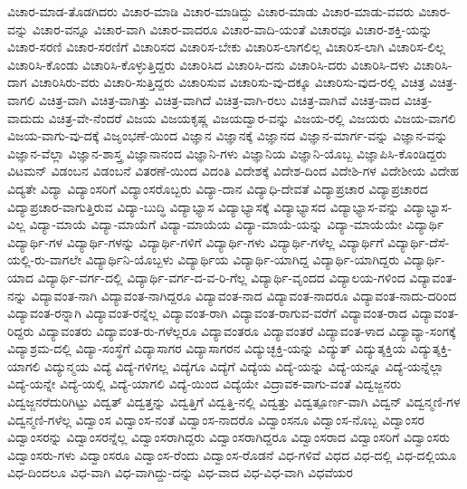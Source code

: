 {ವಿಚಾರ-ಮಾಡ-ತೊಡಗಿದರು
ವಿಚಾರ-ಮಾಡಿ
ವಿಚಾರ-ಮಾಡಿದ್ದು
ವಿಚಾರ-ಮಾಡು
ವಿಚಾರ-ಮಾಡು-ವವರು
ವಿಚಾರ-ವನ್ನು
ವಿಚಾರ-ವನ್ನೂ
ವಿಚಾರ-ವಾಗಿ
ವಿಚಾರ-ವಾದರೂ
ವಿಚಾರ-ವಾದಿ-ಯಂತೆ
ವಿಚಾರವೂ
ವಿಚಾರ-ಶಕ್ತಿ-ಯನ್ನು
ವಿಚಾರ-ಸರಣಿ
ವಿಚಾರ-ಸರಣಿಗೆ
ವಿಚಾರಿಸದ
ವಿಚಾರಿಸ-ಬೇಕು
ವಿಚಾರಿಸ-ಲಾಗಲಿಲ್ಲ
ವಿಚಾರಿಸ-ಲಾಗಿ
ವಿಚಾರಿಸ-ಲಿಲ್ಲ
ವಿಚಾರಿಸಿ-ಕೊಂಡು
ವಿಚಾರಿಸಿ-ಕೊಳ್ಳುತ್ತಿದ್ದರು
ವಿಚಾರಿಸಿದ
ವಿಚಾರಿಸಿ-ದನು
ವಿಚಾರಿಸಿ-ದರು
ವಿಚಾರಿಸಿ-ದಳು
ವಿಚಾರಿಸಿ-ದಾಗ
ವಿಚಾರಿಸಿರು-ವರು
ವಿಚಾರಿ-ಸುತ್ತಿದ್ದರು
ವಿಚಾರಿಸುವ
ವಿಚಾರಿಸು-ವು-ದಕ್ಕೂ
ವಿಚಾರಿಸು-ವುದ-ರಲ್ಲಿ
ವಿಚಿತ್ರ
ವಿಚಿತ್ರ-ವಾಗಲಿ
ವಿಚಿತ್ರ-ವಾಗಿ
ವಿಚಿತ್ರ-ವಾಗಿತ್ತು
ವಿಚಿತ್ರ-ವಾಗಿದೆ
ವಿಚಿತ್ರ-ವಾಗಿ-ರಲು
ವಿಚಿತ್ರ-ವಾಗಿವೆ
ವಿಚಿತ್ರ-ವಾದ
ವಿಚಿತ್ರ-ವಾದುದು
ವಿಚಿತ್ರ-ವೇ-ನೆಂದರೆ
ವಿಜಯ
ವಿಜಯಕೃಷ್ಣ
ವಿಜಯದ್ವಾರ-ವನ್ನು
ವಿಜಯ-ರಲ್ಲಿ
ವಿಜಯರು
ವಿಜಯ-ವಾಗಲಿ
ವಿಜಯ-ವಾಗು-ವು-ದಕ್ಕೆ
ವಿಜೃಂಭಣೆ-ಯಿಂದ
ವಿಜ್ಞಾನ
ವಿಜ್ಞಾನಕ್ಕೆ
ವಿಜ್ಞಾನದ
ವಿಜ್ಞಾನ-ಮಾರ್ಗ-ವನ್ನು
ವಿಜ್ಞಾನ-ವನ್ನು
ವಿಜ್ಞಾನ-ವೆಲ್ಲಾ
ವಿಜ್ಞಾನ-ಶಾಸ್ತ್ರ
ವಿಜ್ಞಾನಾನಂದ
ವಿಜ್ಞಾನಿ-ಗಳು
ವಿಜ್ಞಾನಿಯ
ವಿಜ್ಞಾನಿ-ಯೊಬ್ಬ
ವಿಜ್ಞಾಪಿಸಿ-ಕೊಂಡಿದ್ದರು
ವಿಟಮನ್
ವಿಡಂಬನ
ವಿಡಂಬನೆ
ವಿತರಣೆ-ಯಿಂದ
ವಿದಂತಿ
ವಿದೇಶಕ್ಕೆ
ವಿದೇಶ-ದಿಂದ
ವಿದೇಶಿ-ಗಳ
ವಿದೇಶೀಯ
ವಿದೇಹ
ವಿದ್ಯತೇ
ವಿದ್ಯಾ
ವಿದ್ಯಾಂಸರಿಗೆ
ವಿದ್ಯಾಂಸರೊಬ್ಬರು
ವಿದ್ಯಾ-ದಾನ
ವಿದ್ಯಾಧಿ-ದೇವತೆ
ವಿದ್ಯಾಪ್ರಚಾರ
ವಿದ್ಯಾಪ್ರಚಾರದ
ವಿದ್ಯಾಪ್ರಚಾರ-ವಾಗುತ್ತಿರುವ
ವಿದ್ಯಾ-ಬುದ್ಧಿ
ವಿದ್ಯಾಭ್ಯಾಸ
ವಿದ್ಯಾಭ್ಯಾಸಕ್ಕೆ
ವಿದ್ಯಾಭ್ಯಾಸದ
ವಿದ್ಯಾಭ್ಯಾಸ-ವನ್ನು
ವಿದ್ಯಾಭ್ಯಾಸ-ವಿಲ್ಲ
ವಿದ್ಯಾ-ಮಾಯೆ
ವಿದ್ಯಾ-ಮಾಯೆಗೆ
ವಿದ್ಯಾ-ಮಾಯೆಯ
ವಿದ್ಯಾ-ಮಾಯೆ-ಯನ್ನು
ವಿದ್ಯಾ-ಮಾಯೆಯೇ
ವಿದ್ಯಾರ್ಥಿ
ವಿದ್ಯಾರ್ಥಿ-ಗಳ
ವಿದ್ಯಾರ್ಥಿ-ಗಳನ್ನು
ವಿದ್ಯಾರ್ಥಿ-ಗಳಿಗೆ
ವಿದ್ಯಾರ್ಥಿ-ಗಳು
ವಿದ್ಯಾರ್ಥಿ-ಗಳೆಲ್ಲ
ವಿದ್ಯಾರ್ಥಿಗೆ
ವಿದ್ಯಾರ್ಥಿ-ದೆಸೆ-ಯಲ್ಲಿ-ರು-ವಾಗಲೇ
ವಿದ್ಯಾರ್ಥಿನಿ-ಯೊಬ್ಬಳು
ವಿದ್ಯಾರ್ಥಿಯ
ವಿದ್ಯಾರ್ಥಿ-ಯಾಗಿದ್ದ
ವಿದ್ಯಾರ್ಥಿ-ಯಾಗಿದ್ದರು
ವಿದ್ಯಾರ್ಥಿ-ಯಾದ
ವಿದ್ಯಾರ್ಥಿ-ವರ್ಗ-ದಲ್ಲಿ
ವಿದ್ಯಾರ್ಥಿ-ವರ್ಗ-ದ-ವ-ರಿ-ಗೆಲ್ಲ
ವಿದ್ಯಾರ್ಥಿ-ವೃಂದದ
ವಿದ್ಯಾಲಯ-ಗಳಿಂದ
ವಿದ್ಯಾವಂತ-ನನ್ನು
ವಿದ್ಯಾವಂತ-ನಾಗಿ
ವಿದ್ಯಾವಂತ-ನಾಗಿದ್ದರೂ
ವಿದ್ಯಾವಂತ-ನಾದ
ವಿದ್ಯಾವಂತ-ನಾದರೂ
ವಿದ್ಯಾವಂತ-ನಾದು-ದರಿಂದ
ವಿದ್ಯಾವಂತ-ರನ್ನಾಗಿ
ವಿದ್ಯಾವಂತ-ರನ್ನೆಲ್ಲ
ವಿದ್ಯಾವಂತ-ರಾಗಿ
ವಿದ್ಯಾವಂತ-ರಾಗುವ-ವರೆಗೆ
ವಿದ್ಯಾವಂತ-ರಾದ
ವಿದ್ಯಾವಂತ-ರಿದ್ದರು
ವಿದ್ಯಾವಂತರು
ವಿದ್ಯಾವಂತ-ರು-ಗಳೆಲ್ಲರೂ
ವಿದ್ಯಾವಂತರೂ
ವಿದ್ಯಾವಂತರೆ
ವಿದ್ಯಾವಂತ-ಳಾದ
ವಿದ್ಯಾವ್ಯಾ-ಸಂಗಕ್ಕೆ
ವಿದ್ಯಾಶ್ರಮ-ದಲ್ಲಿ
ವಿದ್ಯಾ-ಸಂಸ್ಥೆಗೆ
ವಿದ್ಯಾಸಾಗರ
ವಿದ್ಯಾಸಾಗರನ
ವಿದ್ಯುಚ್ಛಕ್ತಿ-ಯನ್ನು
ವಿದ್ಯುತ್
ವಿದ್ಯುತ್ಶಕ್ತಿಯ
ವಿದ್ಯುತ್ಶಕ್ತಿ-ಯಾಗಲಿ
ವಿದ್ಯುನ್ಮಯ
ವಿದ್ಯೆ
ವಿದ್ಯೆ-ಗಳಿಗಲ್ಲ
ವಿದ್ಯೆಗೂ
ವಿದ್ಯೆಗೆ
ವಿದ್ಯೆಯ
ವಿದ್ಯೆ-ಯನ್ನು
ವಿದ್ಯೆ-ಯನ್ನೂ
ವಿದ್ಯೆ-ಯನ್ನೆಲ್ಲಾ
ವಿದ್ಯೆ-ಯನ್ನೇ
ವಿದ್ಯೆ-ಯಲ್ಲಿ
ವಿದ್ಯೆ-ಯಾಗಲಿ
ವಿದ್ಯೆ-ಯಿಂದ
ವಿದ್ಯೆಯೇ
ವಿದ್ರಾವಕ-ವಾಗು-ವಂತೆ
ವಿದ್ವಜ್ಜನರು
ವಿದ್ವಜ್ಜನರೆದುರಿಗಿಟ್ಟು
ವಿದ್ವತ್
ವಿದ್ವತ್ತನ್ನು
ವಿದ್ವತ್ತಿಗೆ
ವಿದ್ವತ್ತಿ-ನಲ್ಲಿ
ವಿದ್ವತ್ತು
ವಿದ್ವತ್ಪೂರ್ಣ-ವಾಗಿ
ವಿದ್ವನ್
ವಿದ್ವನ್ಮಣಿ-ಗಳ
ವಿದ್ವನ್ಮಣಿ-ಗಳೆಲ್ಲ
ವಿದ್ವಾಂಸ
ವಿದ್ವಾಂಸ-ನಂತೆ
ವಿದ್ವಾಂಸ-ನಾದರೊ
ವಿದ್ವಾಂಸನೂ
ವಿದ್ವಾಂಸ-ನೊಬ್ಬ
ವಿದ್ವಾಂಸರ
ವಿದ್ವಾಂಸರನ್ನು
ವಿದ್ವಾಂಸರನ್ನೆಲ್ಲ
ವಿದ್ವಾಂಸರಾಗಿದ್ದರು
ವಿದ್ವಾಂಸರಾಗಿದ್ದರೂ
ವಿದ್ವಾಂಸರಾದ
ವಿದ್ವಾಂಸರಿಗೆ
ವಿದ್ವಾಂಸರು
ವಿದ್ವಾಂಸರು-ಗಳು
ವಿದ್ವಾಂಸರೂ
ವಿದ್ವಾಂಸ-ರೆಂದು
ವಿದ್ವಾಂಸ-ರೊಡನೆ
ವಿಧ-ಗಳಿವೆ
ವಿಧದ
ವಿಧ-ದಲ್ಲಿ
ವಿಧ-ದಲ್ಲಿಯೂ
ವಿಧ-ದಿಂದಲೂ
ವಿಧ-ವಾಗಿ
ವಿಧ-ವಾಗಿದ್ದು-ದನ್ನು
ವಿಧ-ವಾದ
ವಿಧ-ವಿಧ-ವಾಗಿ
ವಿಧವೆಯರ
}
